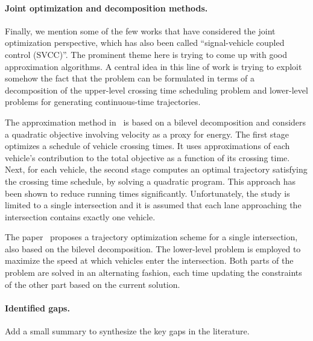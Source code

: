 \documentclass[a4paper]{report}
\theoremstyle{definition}
\theoremstyle{plain}
\newcommand\note[1]{{\color{Navy}#1}}
\begin{document}
\paragraph{Joint optimization and decomposition methods.}

Finally, we mention some of the few works that have considered the joint
optimization perspective, which has also been called ``signal-vehicle coupled
control (SVCC)''. The prominent theme here is trying to come up with good
approximation algorithms. A central idea in this line of work is trying to
exploit somehow the fact that the problem can be formulated in terms of a
decomposition of the upper-level crossing time scheduling problem and
lower-level problems for generating continuous-time trajectories.

The approximation method in~\cite{hultApproximateSolutionOptimal2015} is based
on a bilevel decomposition and considers a quadratic objective involving
velocity as a proxy for energy. The first stage optimizes a schedule of vehicle
crossing times. It uses approximations of each vehicle's contribution to the
total objective as a function of its crossing time. Next, for each vehicle, the
second stage computes an optimal trajectory satisfying the crossing time
schedule, by solving a quadratic program. This approach has been shown to reduce
running times significantly. Unfortunately, the study is limited to a single
intersection and it is assumed that each lane approaching the intersection
contains exactly one vehicle.

The paper~\cite{zhaoBilevelProgrammingModel2021} proposes a trajectory
optimization scheme for a single intersection, also based on the bilevel
decomposition. The lower-level problem is employed to maximize the speed at
which vehicles enter the intersection. Both parts of the problem are solved in an alternating
fashion, each time updating the constraints of the other part based on the
current solution.

\note{\paragraph{Identified gaps.} Add a small summary to synthesize the key gaps in the literature.}

\end{document}
